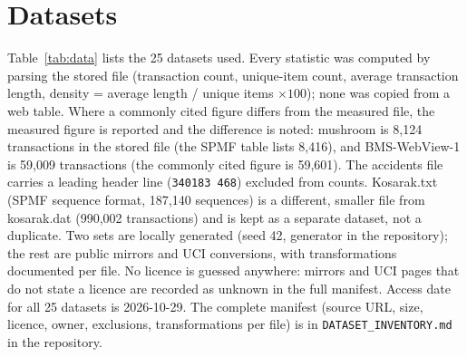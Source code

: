 \documentclass[twocolumn,10pt]{article}
\begin{document}
\section{Datasets}
\label{sec:data}
Table~\ref{tab:data} lists the 25 datasets used. Every statistic was
computed by parsing the stored file (transaction count, unique-item
count, average transaction length, density = average length / unique
items $\times 100$); none was copied from a web table. Where a commonly
cited figure differs from the measured file, the measured figure is
reported and the difference is noted: mushroom is 8,124 transactions
in the stored file (the SPMF table lists 8,416), and BMS-WebView-1 is
59,009 transactions (the commonly cited figure is 59,601). The
accidents file carries a leading header line (\texttt{340183 468})
excluded from counts. Kosarak.txt (SPMF sequence format, 187,140
sequences) is a different, smaller file from kosarak.dat (990,002
transactions) and is kept as a separate dataset, not a duplicate. Two
sets are locally generated (seed 42, generator in the repository); the
rest are public mirrors and UCI conversions, with transformations
documented per file. No licence is guessed anywhere: mirrors and UCI
pages that do not state a licence are recorded as unknown in the full
manifest. Access date for all 25 datasets is 2026-10-29. The complete
manifest (source URL, size, licence, owner, exclusions, transformations
per file) is in \texttt{DATASET\_INVENTORY.md} in the repository.
\end{document}
